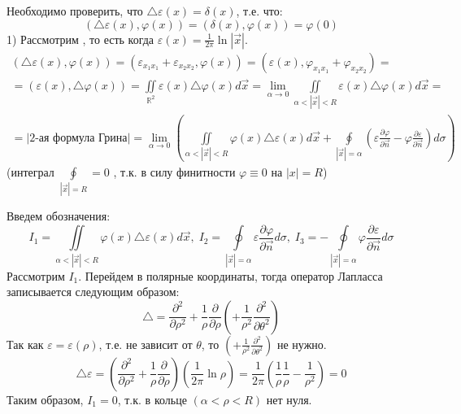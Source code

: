 \begin{Proof}
	Необходимо проверить, что $\triangle \varepsilon (x) = \delta (x) $, т.е. что:
	$$(\triangle \varepsilon (x) , \varphi (x)) = (\delta (x), \varphi (x)) = \varphi (0)$$
	1) Рассмотрим , то есть когда $\varepsilon (x) = \displaystyle \frac{1}{2 \pi} \ln |\vec{x}|$.
	$$\begin{gathered}
		(\triangle \varepsilon (x) , \varphi (x)) = (\varepsilon_{x_1 x_1} + \varepsilon_{x_2 x_2} , \varphi (x)) = (\varepsilon (x), \varphi_{x_1 x_1} + \varphi_{x_2 x_2}) = \\
		= (\varepsilon (x) , \triangle \varphi (x)) = \iint \limits_{\mathbb{R}^2} \varepsilon (x) \triangle \varphi (x) d \vec{x} = \lim_{\alpha \to 0} \iint \limits_{\alpha < |\vec{x}| < R} \varepsilon (x) \triangle \varphi (x) d \vec{x} =  \\
		=\Big|\text{2-ая формула Грина}\Big|
		= \lim_{\alpha \to 0} \left(\iint \limits_{\alpha < |\vec{x}| < R} \varphi (x) \triangle \varepsilon (x) d \vec{x} + \oint \limits_{|\vec{x}| = \alpha} (\varepsilon \frac{\partial \varphi}{\partial \vec{n}} - \varphi \frac{\partial \varepsilon}{\partial \vec{n}}) d \sigma\right)
	\end{gathered}$$
	(интеграл $\oint \limits_{|\vec{x}| = R}=0$ , т.к. в силу финитности $\varphi \equiv 0$ на $|x| = R$)

	Введем обозначения:
	$$I_1 =  \iint \limits_{\alpha < |\vec{x}| < R} \varphi (x) \triangle \varepsilon (x) d \vec{x}, \; I_2 = \oint \limits_{|\vec{x}| = \alpha} \varepsilon \frac{\partial \varphi}{\partial \vec{n}} d \sigma, \; I_3 = - \oint \limits_{|\vec{x}| = \alpha} \varphi \frac{\partial \varepsilon}{\partial \vec{n}} d \sigma$$
	Рассмотрим $I_1$. Перейдем в полярные координаты, тогда оператор Лапласса записывается следующим образом:
	$$ \triangle = \frac{\partial^2}{\partial \rho^2} + \frac{1}{\rho} \frac{\partial}{\partial \rho} \left(+ \frac{1}{\rho^2} \frac {\partial^2}{\partial \theta^2}\right) $$
	Так как $\varepsilon = \varepsilon (\rho)$, т.е. не зависит от $\theta$, то $\left(+ \frac{1}{\rho^2} \frac {\partial^2}{\partial \theta^2}\right)$ не нужно.
	$$\triangle \varepsilon = (\frac{\partial^2}{\partial \rho^2} + \frac{1}{\rho} \frac{\partial}{\partial \rho}) (\frac{1}{2 \pi} \ln \rho) = \frac{1}{2 \pi} (\frac {1}{\rho} \frac {1}{\rho} - \frac {1}{\rho^2}) = 0$$
	Таким образом, $I_1 = 0$, т.к. в кольце $(\alpha < \rho < R)$ нет нуля.\\


\end{Proof}
